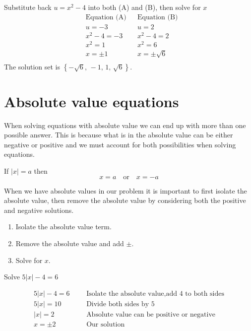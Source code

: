 Substitute back $u=x^2-4$ into both (A) and (B), then solve for $x$
\begin{align*}
    &\text{Equation (A)}    &   &\text{Equation (B)}\\
    &u=-3                   &   &u=2\\
    &x^2-4 = -3             &   &x^2-4=2\\
    &x^2=1                  &   &x^2=6\\
    &x=\pm 1        &   &x=\pm{\sqrt{6}}\\
\end{align*}
The solution set is $\left\{-\sqrt{6},\,-1,\,1,\,\sqrt{6}\right\}$.
\section{Absolute value equations}
When solving equations with absolute value we can end up with more than one possible answer. This is because what is in the absolute value can be either negative or positive and we must account for both possibilities when solving equations.
\begin{tcolorbox}[
                    title=Absolute value rule,
                    fonttitle=\bfseries,
                    colframe=blue!70!red,
                    colback=white
                    ]
    If $|x|=a$ then 
    \[
            x=a\quad \text{or}\quad x=-a
    \]
\end{tcolorbox}
When we have absolute values in our problem it is important to first isolate the absolute value, then remove the absolute value by considering both the positive and negative solutions.
\begin{tcolorbox}[title=Steps to solve an absolute value equation, 
colback=blue!5!white,
colframe=blue!75!black,
fonttitle=\bfseries]
    \begin{enumerate}
        \item Isolate the absolute value term.
        \item Remove the absolute value and add $\pm$.
        \item Solve for $x$.
    \end{enumerate}
\end{tcolorbox}
\begin{exa}
    Solve $5|x|-4=6$
\end{exa}
\begin{align*}
    5|x|-4=6&   &   &\text{Isolate the absolute value,add 4 to both sides}\\
    5|x|=10&    &   &\text{Divide both sides by 5}\\
    |x|=2&  &   &\text{Absolute value can be positive or negative}\\
    x=\pm 2&   &&\text{Our solution}
\end{align*}

